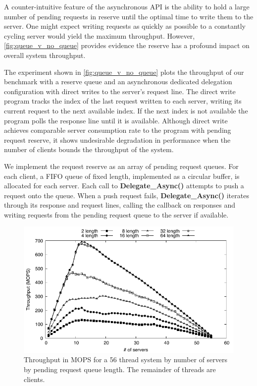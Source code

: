 \documentclass{uicthesi}
\begin{document}
A counter-intuitive feature of the asynchronous API is the ability to hold a large number of pending requests in reserve until the optimal time to write them to the server. One might expect writing requests as quickly as possible to a constantly cycling server would yield the maximum throughput. However, \ref{fig:queue_v_no_queue} provides evidence the reserve has a profound impact on overall system throughput. 

The experiment shown in \ref{fig:queue_v_no_queue} plots the throughput of our benchmark with a reserve queue and an asynchronous dedicated delegation configuration with direct writes to the server's request line. The direct write program tracks the index of the last request written to each server, writing its current request to the next available index. If the next index is not available the program polls the response line until it is available. Although direct write achieves comparable server consumption rate to the program with pending request reserve, it shows undesirable degradation in performance when the number of clients bounds the throughput of the system. 

We implement the request reserve as an array of pending request queues. For each client, a FIFO queue of fixed length, implemented as a circular buffer, is allocated for each server. Each call to \textbf{Delegate\_Async()} attempts to push a request onto the queue. When a push request fails, \textbf{Delegate\_Async()} iterates through its response and request lines, calling the callback on responses and writing requests from the pending request queue to the server if available. 

\begin{figure}[ht!]
\centering
\includegraphics[width=0.9\columnwidth]{FIG/vary_queue_length.pdf}
\caption{Throughput in MOPS for a 56 thread system by number of servers by pending request queue length. The remainder of threads are clients.}
\label{fig:dedicated_vary_queue}
\end{figure}
\end{document}
